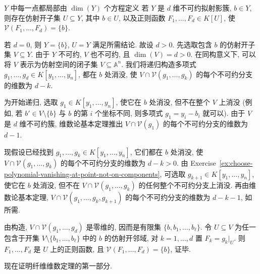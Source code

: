 
\begin{Lemma}{$Y$ 中每一点都局部由 $\dim(Y)$ 个方程定义}\leavevmode\label{lem:point-locally-cut-out-by-dimension-many-functions}
若 $Y$ 是 $d$ 维不可约拟射影簇, $b\in Y$, 则存在仿射开子集 $U\subseteq Y$, 其中 $b\in U$, 以及正则函数 $F_{1},\ldots,F_{d}\in K[U]$, 使 $\mathcal{V}(F_{1},\ldots,F_{d})=\{b\}$.
\end{Lemma}
\begin{Proof}
若 $d=0$, 则 $Y=\{b\}$, $U=Y$ 满足所需结论. 故设 $d>0$. 先选取包含 $b$ 的仿射开子集 $V\subseteq Y$. 由于 $Y$ 不可约, $V$ 也不可约, 且 $\dim(V)=d>0$. 在同构意义下, 可以将 $V$ 表示为仿射空间的闭子集 $V\subseteq\mathbb{A}^{n}$. 我们将递归构造多项式 $g_{1},\ldots,g_{d}\in K[y_{1},\ldots,y_{n}]$, 都在 $b$ 处消没, 使 $V\cap\mathcal{V}(g_{1},\ldots,g_{k})$ 的每个不可约分支的维数为 $d-k$.

为开始递归, 选取 $g_{1}\in K[y_{1},\ldots,y_{n}]$, 使它在 $b$ 处消没, 但不在整个 $V$ 上消没 (例如, 若 $b'\in V\setminus\{b\}$ 与 $b$ 的第 $i$ 个坐标不同, 则多项式 $g_{1}=y_{i}-b_{i}$ 就可以). 由于 $V$ 是 $d$ 维不可约簇, 维数论基本定理推出 $V\cap\mathcal{V}(g_{1})$ 的每个不可约分支的维数为 $d-1$.

现假设已经找到 $g_{1},\ldots,g_{k}\in K[y_{1},\ldots,y_{n}]$, 它们都在 $b$ 处消没, 使 $V\cap\mathcal{V}(g_{1},\ldots,g_{k})$ 的每个不可约分支的维数为 $d-k>0$. 由 Exercise~\ref{ex:choose-polynomial-vanishing-at-point-not-on-components}, 可选取 $g_{k+1}\in K[y_{1},\ldots,y_{n}]$, 使它在 $b$ 处消没, 但不在 $V\cap\mathcal{V}(g_{1},\ldots,g_{k})$ 的任何整个不可约分支上消没. 再由维数论基本定理, $V\cap\mathcal{V}(g_{1},\ldots,g_{k},g_{k+1})$ 的每个不可约分支的维数为 $d-k-1$, 如所需.

由构造, $V\cap\mathcal{V}(g_{1},\ldots,g_{d})$ 是零维的, 因而是有限集 $\{b,b_{1},\ldots,b_{\ell}\}$. 令 $U\subseteq V$ 为任一包含于开集 $V\setminus\{b_{1},\ldots,b_{\ell}\}$ 中的 $b$ 的仿射开邻域, 对 $k=1,\ldots,d$ 置 $F_{k}=g_{k}|_{U}$. 则 $F_{1},\ldots,F_{d}$ 是 $U$ 上的正则函数, 且 $\mathcal{V}(F_{1},\ldots,F_{d})=\{b\}$, 证毕.
\end{Proof}

现在证明纤维维数定理的第一部分.

